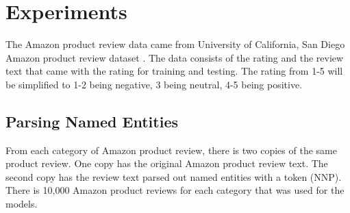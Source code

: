 \documentclass[11pt,a4paper]{article}
\begin{document}






\section{Experiments}

The Amazon product review data came from University of California, San Diego Amazon product review dataset \cite{data}. The data consists of the rating and the review text that came with the rating for training and testing. The rating from 1-5 will be simplified to 1-2 being negative, 3 being neutral, 4-5 being positive.

\subsection{Parsing Named Entities}

From each category of Amazon product review, there is two copies of the same product review. One copy has the original Amazon product review text. The second copy has the review text parsed out named entities with a token (NNP). There is 10,000 Amazon product reviews for each category that was used for the models.
\end{document}
